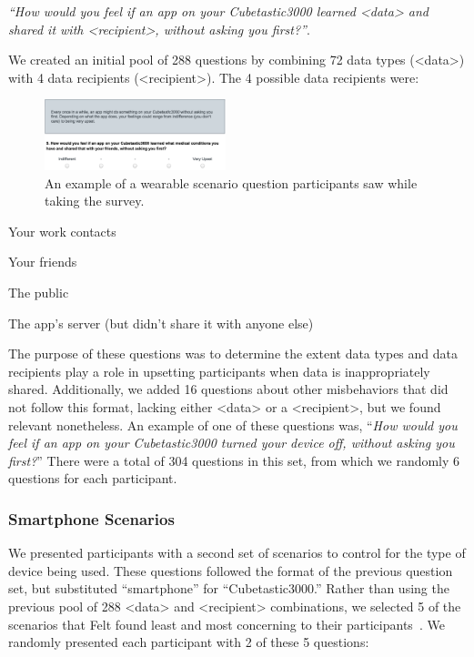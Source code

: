\textit{``How would you feel if an app on your Cubetastic3000 learned <data> and shared it with <recipient>, without asking you first?''}. 

We created an initial pool of 288 questions by combining 72 data types (<data>) with 4 data recipients (<recipient>). The 4 possible data recipients were: \\[-.8cm]

\begin{figure}[t]
	\centering
	\includegraphics[width=0.47\textwidth]{images/prompt.pdf}
	\caption{An example of a wearable scenario question participants saw while taking the survey.}
	\label{fig:prompt}
\end{figure}

\begin{packed_item}
\item Your work contacts
\item Your friends
\item The public
\item The app's server (but didn't share it with anyone else)\\[-.8cm]
\end{packed_item}

The purpose of these questions was to determine the extent data types and data recipients play a role in upsetting participants when data is inappropriately shared. Additionally, we added 16 questions about other misbehaviors that did not follow this format, lacking either <data> or a <recipient>, but we found relevant nonetheless. An example of one of these questions was, ``\textit{How would you feel if an app on your Cubetastic3000 turned your device off, without asking you first?}'' There were a total of 304 questions in this set, from which we randomly 6 questions for each participant.

\subsubsection{Smartphone Scenarios}
\label{sec:smartphones}
We presented participants with a second set of scenarios to control for the type of device being used. These questions followed the format of the previous question set, but substituted ``smartphone'' for ``Cubetastic3000.'' Rather than using the previous pool of 288 <data> and <recipient> combinations, we selected 5 of the scenarios that Felt \etal found least and most concerning to their participants~\cite{Felt}. We randomly presented each participant with 2 of these 5 questions: \\[-.8cm]

